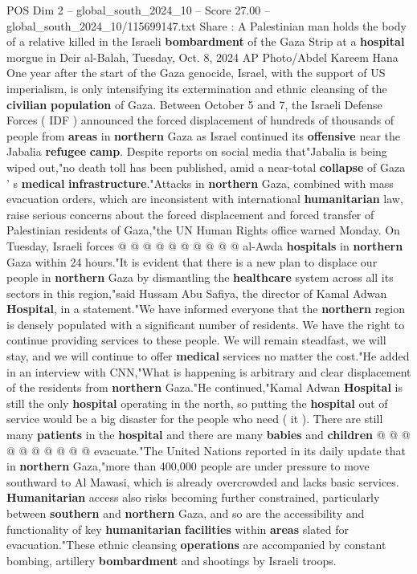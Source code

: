 \begin{textsample}{POS Dim 2 – global\_south\_2024\_10 – Score 27.00 – global\_south\_2024\_10/115699147.txt}  \label{ex:f2_pos_140}
Share : A Palestinian man holds the body of a relative killed in the Israeli \textbf{bombardment} of the Gaza Strip at a \textbf{hospital} morgue in Deir al-Balah, Tuesday, Oct. 8, 2024 AP Photo/Abdel Kareem Hana One year after the start of the Gaza genocide, Israel, with the support of US imperialism, is only intensifying its extermination and ethnic cleansing of the \textbf{civilian} \textbf{population} of Gaza.
Between October 5 and 7, the Israeli Defense Forces ( IDF ) announced the forced displacement of hundreds of thousands of people from \textbf{areas} in \textbf{northern} Gaza as Israel continued its \textbf{offensive} near the Jabalia \textbf{refugee} \textbf{camp}.
Despite reports on social media that"Jabalia is being wiped out,"no death toll has been published, amid a near-total \textbf{collapse} of Gaza ' s \textbf{medical} \textbf{infrastructure}."Attacks in \textbf{northern} Gaza, combined with mass evacuation orders, which are inconsistent with international \textbf{humanitarian} law, raise serious concerns about the forced displacement and forced transfer of Palestinian residents of Gaza,"the UN Human Rights office warned Monday.
On Tuesday, Israeli forces @ @ @ @ @ @ @ @ @ @ al-Awda \textbf{hospitals} in \textbf{northern} Gaza within 24 hours."It is evident that there is a new plan to displace our people in \textbf{northern} Gaza by dismantling the \textbf{healthcare} system across all its sectors in this region,"said Hussam Abu Safiya, the director of Kamal Adwan \textbf{Hospital}, in a statement."We have informed everyone that the \textbf{northern} region is densely populated with a significant number of residents.
We have the right to continue providing services to these people.
We will remain steadfast, we will stay, and we will continue to offer \textbf{medical} services no matter the cost."He added in an interview with CNN,"What is happening is arbitrary and clear displacement of the residents from \textbf{northern} Gaza."He continued,"Kamal Adwan \textbf{Hospital} is still the only \textbf{hospital} operating in the north, so putting the \textbf{hospital} out of service would be a big disaster for the people who need ( it ).
There are still many \textbf{patients} in the \textbf{hospital} and there are many \textbf{babies} and \textbf{children} @ @ @ @ @ @ @ @ @ @ evacuate."The United Nations reported in its daily update that in \textbf{northern} Gaza,"more than 400,000 people are under pressure to move southward to Al Mawasi, which is already overcrowded and lacks basic services. \textbf{Humanitarian} access also risks becoming further constrained, particularly between \textbf{southern} and \textbf{northern} Gaza, and so are the accessibility and functionality of key \textbf{humanitarian} \textbf{facilities} within \textbf{areas} slated for evacuation."These ethnic cleansing \textbf{operations} are accompanied by constant bombing, artillery \textbf{bombardment} and shootings by Israeli troops.

\end{textsample}
